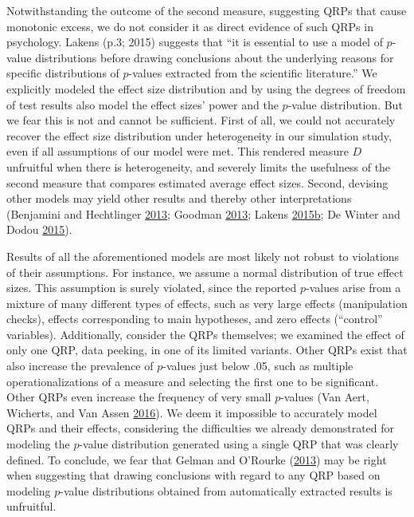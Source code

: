 \documentclass[a5paper]{book}
\begin{document}
Notwithstanding the outcome of the second measure, suggesting QRPs that
cause monotonic excess, we do not consider it as direct evidence of such
QRPs in psychology. Lakens (p.3; 2015) suggests that \enquote{it is
essential to use a model of \(p\)-value distributions before drawing
conclusions about the underlying reasons for specific distributions of
\(p\)-values extracted from the scientific literature.} We explicitly
modeled the effect size distribution and by using the degrees of freedom
of test results also model the effect sizes' power and the \(p\)-value
distribution. But we fear this is not and cannot be sufficient. First of
all, we could not accurately recover the effect size distribution under
heterogeneity in our simulation study, even if all assumptions of our
model were met. This rendered measure \(D\) unfruitful when there is
heterogeneity, and severely limits the usefulness of the second measure
that compares estimated average effect sizes. Second, devising other
models may yield other results and thereby other interpretations
(Benjamini and Hechtlinger
\protect\hyperlink{ref-doi:10.1093ux2fbiostatisticsux2fkxt032}{2013};
Goodman
\protect\hyperlink{ref-doi:10.1093ux2fbiostatisticsux2fkxt035}{2013};
Lakens
\protect\hyperlink{ref-doi:10.7717ux2fpeerj.1142}{2015}\protect\hyperlink{ref-doi:10.7717ux2fpeerj.1142}{b};
De Winter and Dodou
\protect\hyperlink{ref-doi:10.7717ux2fpeerj.733}{2015}).

Results of all the aforementioned models are most likely not robust to
violations of their assumptions. For instance, we assume a normal
distribution of true effect sizes. This assumption is surely violated,
since the reported \(p\)-values arise from a mixture of many different
types of effects, such as very large effects (manipulation checks),
effects corresponding to main hypotheses, and zero effects
(\enquote{control} variables). Additionally, consider the QRPs
themselves; we examined the effect of only one QRP, data peeking, in one
of its limited variants. Other QRPs exist that also increase the
prevalence of \(p\)-values just below .05, such as multiple
operationalizations of a measure and selecting the first one to be
significant. Other QRPs even increase the frequency of very small
\(p\)-values (Van Aert, Wicherts, and Van Assen
\protect\hyperlink{ref-doi:10.1177ux2f1745691616650874}{2016}). We deem
it impossible to accurately model QRPs and their effects, considering
the difficulties we already demonstrated for modeling the \(p\)-value
distribution generated using a single QRP that was clearly defined. To
conclude, we fear that Gelman and O'Rourke
(\protect\hyperlink{ref-doi:10.1093ux2fbiostatisticsux2fkxt034}{2013})
may be right when suggesting that drawing conclusions with regard to any
QRP based on modeling \(p\)-value distributions obtained from
automatically extracted results is unfruitful.
\end{document}
